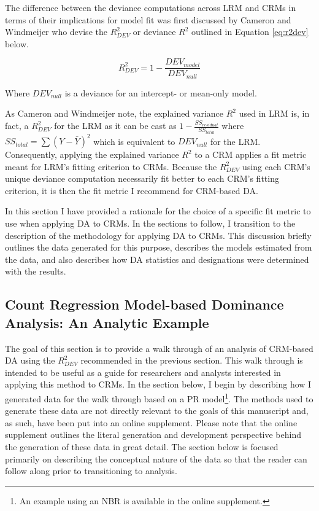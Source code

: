 \documentclass[ShortAfour,times,sageapa]{sagej}
\begin{document}
	The difference between the deviance computations across LRM and CRMs in terms of their implications for model fit was first discussed by Cameron and Windmeijer \citeyear{cameron1996r} who devise the $R^2_{DEV}$ or deviance $R^2$ outlined in Equation \ref{eq:r2dev} below.
	
	\begin{equation}
		R^{2}_{DEV} = 1 - \frac{DEV_{model}}{DEV_{null}}
		\label{eq:r2dev}
	\end{equation}
	
	Where $DEV_{null}$ is a deviance for an intercept- or mean-only model.
	
	As Cameron and Windmeijer note, the explained variance $R^2$ used in LRM is, in fact, a $R^2_{DEV}$ for the LRM as it can be cast as $1 - \frac{SS_{residual}}{SS_{total}}$ where $SS_{total} = \sum (Y - \bar{Y})^2$ which is equivalent to $DEV_{null}$ for the LRM.
	Consequently, applying the explained variance $R^2$ to a CRM applies a fit metric meant for LRM's fitting criterion to CRMs.
	Because the $R^{2}_{DEV}$ using each CRM's unique deviance computation necessarily fit better to each CRM's fitting criterion, it is then the fit metric I recommend for CRM-based DA.
	
	In this section I have provided a rationale for the choice of a specific fit metric to use when applying DA to CRMs.
	In the sections to follow, I transition to the description of the methodology for applying DA to CRMs.
	This discussion briefly outlines the data generated for this purpose, describes the models estimated from the data, and also describes how DA statistics and designations were determined with the results.
	
	\subsection{Count Regression Model-based Dominance Analysis: An Analytic Example}
	
	The goal of this section is to provide a walk through of an analysis of CRM-based DA using the $R^2_{DEV}$ recommended in the previous section.
	This walk through is intended to be useful as a guide for researchers and analysts interested in applying this method to CRMs.
	In the section below, I begin by describing how I generated data for the walk through based on a PR model\footnote{
		An example using an NBR is available in the online supplement.}.
	The methods used to generate these data are not directly relevant to the goals of this manuscript and, as such, have been put into an online supplement.
	Please note that the online supplement outlines the literal generation and development perspective behind the generation of these data in great detail.
	The section below is focused primarily on describing the conceptual nature of the data so that the reader can follow along prior to transitioning to analysis.
	
\end{document}
